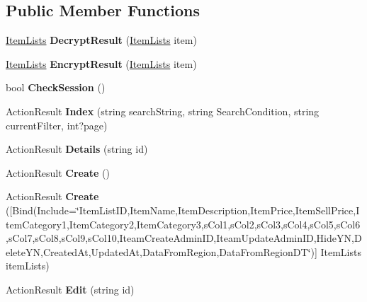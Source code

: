 \subsection*{Public Member Functions}
\begin{DoxyCompactItemize}
\item 
\hyperlink{a00127}{Item\+Lists} {\bfseries Decrypt\+Result} (\hyperlink{a00127}{Item\+Lists} item)\hypertarget{a00128_afaead79ac9a7fdb8635d9e16b54756f8}{}\label{a00128_afaead79ac9a7fdb8635d9e16b54756f8}

\item 
\hyperlink{a00127}{Item\+Lists} {\bfseries Encrypt\+Result} (\hyperlink{a00127}{Item\+Lists} item)\hypertarget{a00128_a2218b6dceb61b6575c19777cb09a7d77}{}\label{a00128_a2218b6dceb61b6575c19777cb09a7d77}

\item 
bool {\bfseries Check\+Session} ()\hypertarget{a00128_a3db0e41529d4f5be204c1fb2d0c5276e}{}\label{a00128_a3db0e41529d4f5be204c1fb2d0c5276e}

\item 
Action\+Result {\bfseries Index} (string search\+String, string Search\+Condition, string current\+Filter, int?page)\hypertarget{a00128_acaec90a19c92a756dd185ab14faf9b36}{}\label{a00128_acaec90a19c92a756dd185ab14faf9b36}

\item 
Action\+Result {\bfseries Details} (string id)\hypertarget{a00128_a83c27a70a14a94060b079b20bca83cb5}{}\label{a00128_a83c27a70a14a94060b079b20bca83cb5}

\item 
Action\+Result {\bfseries Create} ()\hypertarget{a00128_ae746a6b5bd4045b9e9baa3af39582c73}{}\label{a00128_ae746a6b5bd4045b9e9baa3af39582c73}

\item 
Action\+Result {\bfseries Create} (\mbox{[}Bind(Include=\char`\"{}Item\+List\+ID,Item\+Name,Item\+Description,Item\+Price,Item\+Sell\+Price,Item\+Category1,Item\+Category2,Item\+Category3,s\+Col1,s\+Col2,s\+Col3,s\+Col4,s\+Col5,s\+Col6,s\+Col7,s\+Col8,s\+Col9,s\+Col10,Iteam\+Create\+Admin\+ID,Iteam\+Update\+Admin\+ID,Hide\+YN,Delete\+YN,Created\+At,Updated\+At,Data\+From\+Region,Data\+From\+Region\+DT\char`\"{})\mbox{]} Item\+Lists item\+Lists)\hypertarget{a00128_aed59ce39eec3d4b040fae8d055d60dad}{}\label{a00128_aed59ce39eec3d4b040fae8d055d60dad}

\item 
Action\+Result {\bfseries Edit} (string id)\hypertarget{a00128_a3631ffbf29c6c1486b3e0ef45eedd6e9}{}\label{a00128_a3631ffbf29c6c1486b3e0ef45eedd6e9}


\end{DoxyCompactItemize}
